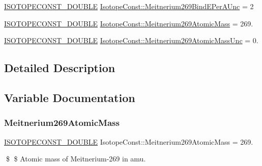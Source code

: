 \begin{DoxyCompactItemize}
\mbox{\hyperlink{group___isotope_const-_macros_ga8f45a7272ce02c0b4c65c44636ed719a}{I\+S\+O\+T\+O\+P\+E\+C\+O\+N\+S\+T\+\_\+\+D\+O\+U\+B\+LE}} \mbox{\hyperlink{group___isotope_const-_meitnerium-_mt269_gad73daa07278ad2cad56a684761d8883f}{Isotope\+Const\+::\+Meitnerium269\+Bind\+E\+Per\+A\+Unc}} = 2
\item 
\mbox{\hyperlink{group___isotope_const-_macros_ga8f45a7272ce02c0b4c65c44636ed719a}{I\+S\+O\+T\+O\+P\+E\+C\+O\+N\+S\+T\+\_\+\+D\+O\+U\+B\+LE}} \mbox{\hyperlink{group___isotope_const-_meitnerium-_mt269_gabc5b9caf7ee39ea4ab5e83fc63a74514}{Isotope\+Const\+::\+Meitnerium269\+Atomic\+Mass}} = 269.
\item 
\mbox{\hyperlink{group___isotope_const-_macros_ga8f45a7272ce02c0b4c65c44636ed719a}{I\+S\+O\+T\+O\+P\+E\+C\+O\+N\+S\+T\+\_\+\+D\+O\+U\+B\+LE}} \mbox{\hyperlink{group___isotope_const-_meitnerium-_mt269_gab6bc93c4ffdded6d06f6bb969dee8e61}{Isotope\+Const\+::\+Meitnerium269\+Atomic\+Mass\+Unc}} = 0.
\end{DoxyCompactItemize}


\subsection{Detailed Description}


\subsection{Variable Documentation}
\mbox{\label{group___isotope_const-_meitnerium-_mt269_gabc5b9caf7ee39ea4ab5e83fc63a74514}} 
\subsubsection{\texorpdfstring{Meitnerium269\+Atomic\+Mass}{Meitnerium269AtomicMass}}
{\footnotesize\ttfamily \mbox{\hyperlink{group___isotope_const-_macros_ga8f45a7272ce02c0b4c65c44636ed719a}{I\+S\+O\+T\+O\+P\+E\+C\+O\+N\+S\+T\+\_\+\+D\+O\+U\+B\+LE}} Isotope\+Const\+::\+Meitnerium269\+Atomic\+Mass = 269.}

\$ \$ Atomic mass of Meitnerium-\/269 in amu. \mbox{\label{group___isotope_const-_meitnerium-_mt269_gab6bc93c4ffdded6d06f6bb969dee8e61}} 

